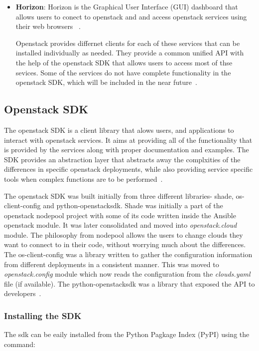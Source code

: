 \begin{itemize}
\item \textbf{Horizon}: Horizon is the Graphical User Interface (GUI) dashboard
that allows users to conect to openstack and and access openstack
services using their web browsers~\cite{hid-sp18-503-oracle-openstack}
\cite{hid-sp18-503-horizon}.

Openstack provides differnet clients for each of these services that
can be installed individually as needed. They provide a common unified
API with the help of the openstack SDK that allows users to access
most of thse sevices. Some of the services do not have complete
functionality in the openstack SDK, which will be included in the near
future~\cite{hid-sp18-503-openstack-sdk}.
\end{itemize}

\subsection{Openstack SDK}
The openstack SDK is a client library that alows users, and
applications to interact with openstack services. It aims at providing
all of the functionality that is provided by the services along with
proper documentation and examples. The SDK provides an abstraction
layer that abstracts away the complxities of the differences in
specific openstack deployments, while also providing service specific
tools when complex functions are to be
performed~\cite{hid-sp18-503-openstack-sdk-history}.

The openstack SDK was built initially from three different libraries-
shade, os-client-config and python-openstacksdk. Shade was initially a
part of the openstack nodepool project with some of its code written
inside the Ansible openstack module. It was later consolidated and
moved into \emph{openstack.cloud} module. The philosophy from nodepool
allows the users to change clouds they want to connect to in their
code, without worrying much about the differences. The
os-client-config was a library written to gather the configuration
information from different deployments in a consistent manner. This
was moved to \emph{openstack.config} module which now reads the
configuration from the \emph{clouds.yaml} file (if available). The
python-openstacksdk was a library that exposed the API to
developers~\cite{hid-sp18-503-openstack-sdk-history}.

\subsubsection{Installing the SDK}
The sdk can be eaily installed from the Python Pagkage Index (PyPI)
using the command:

